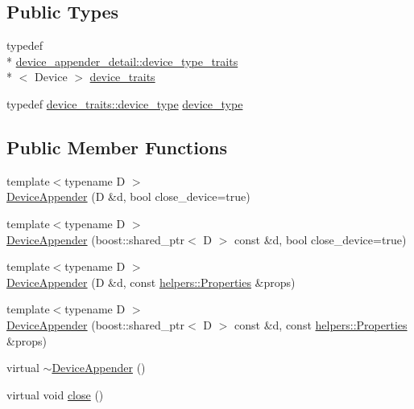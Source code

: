 \subsection*{Public Types}
\begin{DoxyCompactItemize}
\item 
typedef \\*
\hyperlink{structlog4cplus_1_1device__appender__detail_1_1device__type__traits}{device\-\_\-appender\-\_\-detail\-::device\-\_\-type\-\_\-traits}\\*
$<$ Device $>$ \hyperlink{classlog4cplus_1_1DeviceAppender_a83e74702b437b83036b314068959c558}{device\-\_\-traits}
\item 
typedef \hyperlink{structlog4cplus_1_1device__appender__detail_1_1device__type__traits_a302a3631da80b1b7944eb4edb6690730}{device\-\_\-traits\-::device\-\_\-type} \hyperlink{classlog4cplus_1_1DeviceAppender_a590c81a55f4366f846373b4f19559d06}{device\-\_\-type}
\end{DoxyCompactItemize}
\subsection*{Public Member Functions}
\begin{DoxyCompactItemize}
\item 
{\footnotesize template$<$typename D $>$ }\\\hyperlink{classlog4cplus_1_1DeviceAppender_a8e1efdd99fdfb3e23e76dd4336f24561}{Device\-Appender} (D \&d, bool close\-\_\-device=true)
\item 
{\footnotesize template$<$typename D $>$ }\\\hyperlink{classlog4cplus_1_1DeviceAppender_a6c8f22fd45988095090268b9fae02b37}{Device\-Appender} (boost\-::shared\-\_\-ptr$<$ D $>$ const \&d, bool close\-\_\-device=true)
\item 
{\footnotesize template$<$typename D $>$ }\\\hyperlink{classlog4cplus_1_1DeviceAppender_a2d7b3bb3911df2c15149a5f01aba636a}{Device\-Appender} (D \&d, const \hyperlink{classlog4cplus_1_1helpers_1_1Properties}{helpers\-::\-Properties} \&props)
\item 
{\footnotesize template$<$typename D $>$ }\\\hyperlink{classlog4cplus_1_1DeviceAppender_af76fa334a528af7230df083483c7f363}{Device\-Appender} (boost\-::shared\-\_\-ptr$<$ D $>$ const \&d, const \hyperlink{classlog4cplus_1_1helpers_1_1Properties}{helpers\-::\-Properties} \&props)
\item 
virtual \hyperlink{classlog4cplus_1_1DeviceAppender_abec124b2300de65539674dda7f4e49b9}{$\sim$\-Device\-Appender} ()
\item 
virtual void \hyperlink{classlog4cplus_1_1DeviceAppender_a85fa48dfb0f86439bbdcb26b31db8f0f}{close} ()
\end{DoxyCompactItemize}
